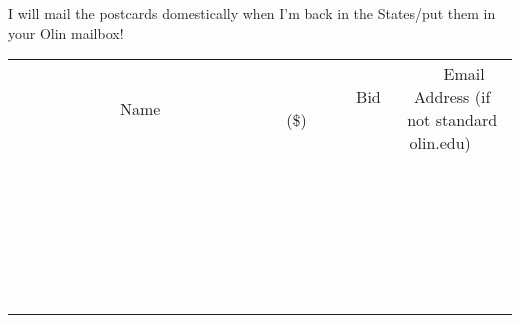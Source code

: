 \documentclass[11pt]{article}
\begin{document}
I will mail the postcards domestically when I'm back in the States/put them in your Olin mailbox! \\[6ex]
\begin{tabular}{c c c}
~~~~~~~~~~~~~Name~~~~~~~~~~~~~ & ~~~~~~~~~Bid (\$)~~~~~~~~~ & ~~~Email Address (if not standard olin.edu)~~~ \\
 & & \\
\hline
 & & \\
\hline
 & & \\
\hline
 & & \\
\hline
 & & \\
\hline
 & & \\
\hline
 & & \\
\hline
 & & \\
\hline
 & & \\
\hline
 & & \\
\hline
 & & \\
\hline
 & & \\
\hline
 & & \\
\hline
 & & \\
\hline
 & & \\
\hline
 & & \\
\hline
 & & \\
\hline
 & & \\
\hline
 & & \\
\hline
 & & \\
\hline
 & & \\
\hline
 & & \\
\hline
 & & \\
\hline
 & & \\
\hline
 & & \\
\hline
 & & \\
\hline
\end{tabular}
\clearpage
\end{document}

